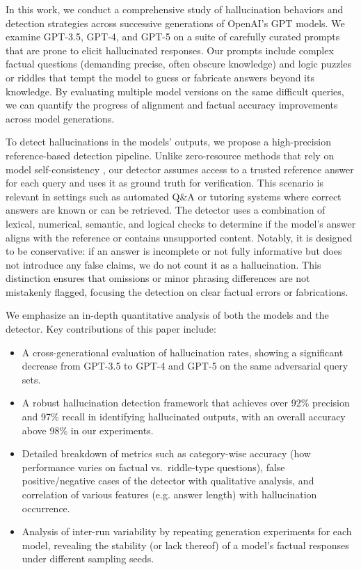 \documentclass{article}
\begin{document}
In this work, we conduct a comprehensive study of hallucination behaviors and detection strategies across successive generations of OpenAI's GPT models. We examine GPT-3.5, GPT-4, and GPT-5 on a suite of carefully curated prompts that are prone to elicit hallucinated responses. Our prompts include complex factual questions (demanding precise, often obscure knowledge) and logic puzzles or riddles that tempt the model to guess or fabricate answers beyond its knowledge. By evaluating multiple model versions on the same difficult queries, we can quantify the progress of alignment and factual accuracy improvements across model generations.

To detect hallucinations in the models' outputs, we propose a high-precision reference-based detection pipeline. Unlike zero-resource methods that rely on model self-consistency \cite{manakul2023selfcheck}, our detector assumes access to a trusted reference answer for each query and uses it as ground truth for verification. This scenario is relevant in settings such as automated Q\&A or tutoring systems where correct answers are known or can be retrieved. The detector uses a combination of lexical, numerical, semantic, and logical checks to determine if the model's answer aligns with the reference or contains unsupported content. Notably, it is designed to be conservative: if an answer is incomplete or not fully informative but does not introduce any false claims, we do not count it as a hallucination. This distinction ensures that omissions or minor phrasing differences are not mistakenly flagged, focusing the detection on clear factual errors or fabrications.

We emphasize an in-depth quantitative analysis of both the models and the detector. Key contributions of this paper include:
\begin{itemize}
    \item A cross-generational evaluation of hallucination rates, showing a significant decrease from GPT-3.5 to GPT-4 and GPT-5 on the same adversarial query sets.
    \item A robust hallucination detection framework that achieves over 92\% precision and 97\% recall in identifying hallucinated outputs, with an overall accuracy above 98\% in our experiments.
    \item Detailed breakdown of metrics such as category-wise accuracy (how performance varies on factual vs.\ riddle-type questions), false positive/negative cases of the detector with qualitative analysis, and correlation of various features (e.g. answer length) with hallucination occurrence.
    \item Analysis of inter-run variability by repeating generation experiments for each model, revealing the stability (or lack thereof) of a model’s factual responses under different sampling seeds.
\end{itemize}
\end{document}
